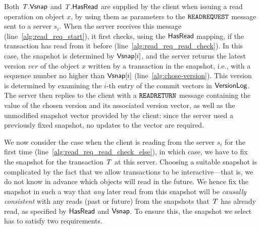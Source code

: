 Both $\mathit{T}.\mathsf{Vsnap}$ and $\mathit{T}.\mathsf{HasRead}$ are supplied by the client when issuing a read operation on object $x$, by using them as parameters to the ${\tt READREQUEST}$ message sent to a server $s_i$. When the server receives this message (line~\ref{alg:read_req_start}), it first checks, using the $\mathsf{HasRead}$ mapping, if the transaction has read from it before (line~\ref{alg:read_req_read_check}). In this case, the snapshot is determined by $\mathsf{Vsnap}[i]$, and the server returns the latest version $\mathit{ver}$ of the object $x$ written by a transaction in the snapshot, i.e., with a sequence number no higher than $\mathsf{Vsnap}[i]$ (line~\ref{alg:chose-version}). This version is determined by examining the $i$-th entry of the commit vectors in $\mathsf{VersionLog}$. The server then replies to the client with a ${\tt READRETURN}$ message containing the value of the chosen version and its associated version vector, as well as the unmodified snapshot vector provided by the client: since the server used a previously fixed snapshot, no updates to the vector are required.


We now consider the case when the client is reading from the server $s_i$ for the first time (line~\ref{alg:read_req_read_check_else}), in which case, we have to fix the snapshot for the transaction $\mathit{T}$ at this server. Choosing a suitable snapshot is complicated by the fact that we allow transactions to be interactive---that is, we do not know in advance which objects will read in the future. We hence fix the snapshot in such a way that \emph{any} later read from this snapshot will be \emph{causally consistent} with any reads (past or future) from the snapshots that $\mathit{T}$ has already read, as specified by $\mathsf{HasRead}$ and $\mathsf{Vsnap}$. To ensure this, the snapshot we select has to satisfy two requirements.

